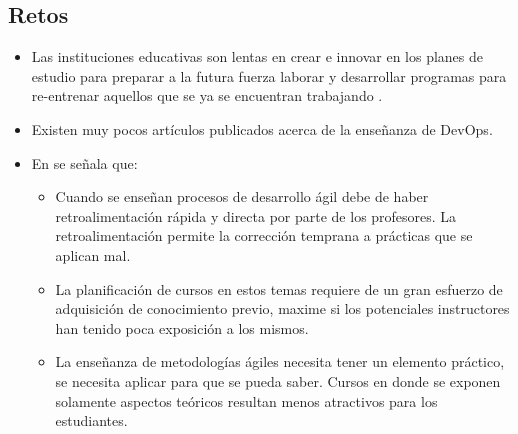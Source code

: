\subsection{Retos} \label{sec:retos}
\begin{itemize}

    \item Las instituciones educativas son lentas en crear e innovar en los planes de estudio para preparar a la futura fuerza laborar y desarrollar programas para re-entrenar aquellos que se ya se encuentran trabajando \cite{cenfotec-2}.
    \item Existen muy pocos artículos publicados acerca de la enseñanza de DevOps\cite{henrik-b}.
    \item En \cite{steghoger-et-al} se señala que:
        \begin{itemize}
            \item Cuando se enseñan procesos de desarrollo ágil debe de haber retroalimentación rápida y directa por parte de los profesores. La retroalimentación permite la corrección temprana a prácticas que se aplican mal.
            \item La planificación de cursos en estos temas requiere de un gran esfuerzo de adquisición de conocimiento previo, maxime si los potenciales instructores han tenido poca exposición a los mismos.
            \item La enseñanza de metodologías ágiles necesita tener un elemento práctico, se necesita aplicar para que se pueda saber. Cursos en donde se exponen solamente aspectos teóricos resultan menos atractivos para los estudiantes. 
        \end{itemize} 
        

\end{itemize}

